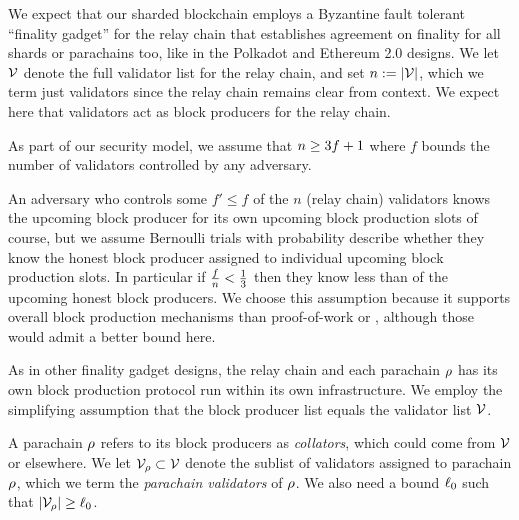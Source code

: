 We expect that our sharded blockchain employs a Byzantine fault tolerant ``finality gadget'' for the relay chain that establishes agreement on finality for all shards or parachains too, like in the Polkadot and Ethereum 2.0 designs.  We let $\mathcal{V}$ denote the full validator list for the relay chain, and set $n := |\mathcal{V}|$, which we term just validators since the relay chain remains clear from context.  We expect here that validators act as block producers for the relay chain.  

As part of our security model, we assume that $n \ge 3 f + 1$ where $f$ bounds the number of validators controlled by any adversary.

An adversary who controls some $f' \le f$ of the $n$ (relay chain) validators knows the upcoming block producer for its own upcoming block production slots of course, but we assume Bernoulli trials with probability  describe whether they know the honest block producer assigned to individual upcoming block production slots.  In particular if ${f \over n} < {1\over3}$ then they know less than  of the upcoming honest block producers.
We choose this assumption because it supports overall  block production mechanisms than proof-of-work or \cite{Praos}, although those would admit a better bound here. 

As in other finality gadget designs, the relay chain and each parachain $\rho$ has its own block production protocol run within its own infrastructure.  We employ the simplifying assumption that the block producer list equals the validator list $\mathcal{V}$.  


A parachain $\rho$ refers to its block producers as {\em collators}, which could come from $\mathcal{V}$ or elsewhere.  We let $\mathcal{V}_{\rho} \subset \mathcal{V}$ denote the sublist of validators assigned to parachain $\rho$, which we term the {\em parachain validators} of $\rho$.  We also need a bound $\ell_0$ such that $|\mathcal{V}_{\rho}| \ge \ell_0$.

